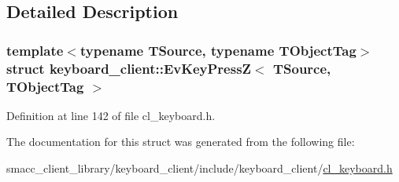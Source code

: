 \subsection{Detailed Description}
\subsubsection*{template$<$typename T\+Source, typename T\+Object\+Tag$>$\newline
struct keyboard\+\_\+client\+::\+Ev\+Key\+Press\+Z$<$ T\+Source, T\+Object\+Tag $>$}



Definition at line 142 of file cl\+\_\+keyboard.\+h.



The documentation for this struct was generated from the following file\+:\begin{DoxyCompactItemize}
\item 
smacc\+\_\+client\+\_\+library/keyboard\+\_\+client/include/keyboard\+\_\+client/\hyperlink{cl__keyboard_8h}{cl\+\_\+keyboard.\+h}\end{DoxyCompactItemize}
